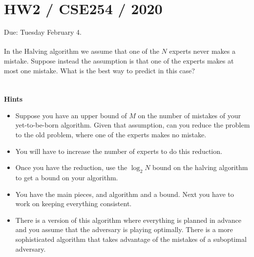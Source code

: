 \documentclass[12pt]{article}
\begin{document}
 
 
\section{HW2 / CSE254 / 2020}

Due: Tuesday February 4.
~\\~\\

In the Halving algorithm we assume that one of the $N$ experts never makes
a mistake. Suppose instead the assumption is that one of the experts
makes at most one mistake. What is the best way to predict in this
case?
~\\
~\\
~\\
{\bf Hints}
\begin{itemize}
  \item Suppose you have an upper bound of $M$ on the number of
    mistakes of your yet-to-be-born algorithm. Given that assumption,
    can you reduce the problem to the old problem, where one of the
    experts makes no mistake.
  \item You will have to increase the number of experts to do this reduction.
  \item Once you have the reduction, use the $\log_2 N$ bound on the
    halving algorithm to get a bound on your algorithm.
  \item You have the main pieces, and algorithm and  a bound. Next you
    have to work on keeping everything consistent.
  \item There is a version of this algorithm where everything is
    planned in advance and you assume that the adversary is playing
    optimally. There is a more sophisticated algorithm that takes
    advantage of the mistakes of a suboptimal adversary.
\end{itemize}
\end{document}
